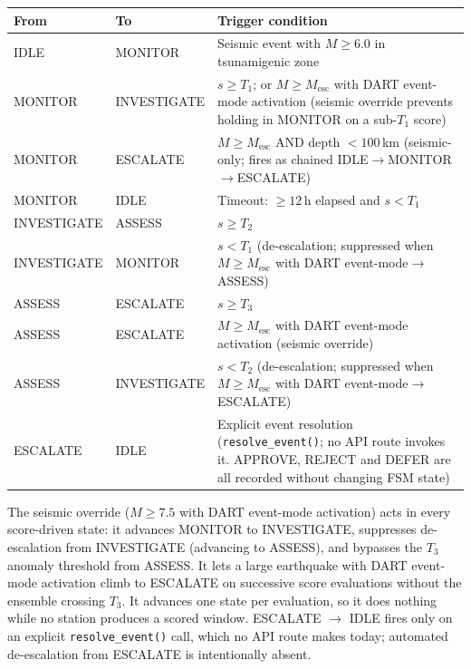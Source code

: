 \documentclass{article}
\begin{document}
\begin{center}
\begin{minipage}{\linewidth}
\centering
{}
\label{tab:fsm-rules}
\small
\begin{tabular}{@{}llp{5.5cm}@{}}
\toprule
From & To & Trigger condition \\
\midrule
IDLE & MONITOR & Seismic event with $M \geq 6.0$ in tsunamigenic zone \\
\addlinespace
MONITOR & INVESTIGATE & $s \geq T_1$; or $M \geq M_{\mathrm{esc}}$ with DART event-mode activation (seismic override prevents holding in MONITOR on a sub-$T_1$ score) \\
MONITOR & ESCALATE & $M \geq M_{\mathrm{esc}}$ AND depth $< 100$\,km (seismic-only; fires as chained IDLE$\to$MONITOR$\to$ESCALATE) \\
MONITOR & IDLE & Timeout: $\geq 12$\,h elapsed and $s < T_1$ \\
\addlinespace
INVESTIGATE & ASSESS & $s \geq T_2$ \\
INVESTIGATE & MONITOR & $s < T_1$ (de-escalation; suppressed when $M \geq M_{\mathrm{esc}}$ with DART event-mode$\to$ASSESS) \\
\addlinespace
ASSESS & ESCALATE & $s \geq T_3$ \\
ASSESS & ESCALATE & $M \geq M_{\mathrm{esc}}$ with DART event-mode activation (seismic override) \\
ASSESS & INVESTIGATE & $s < T_2$ (de-escalation; suppressed when $M \geq M_{\mathrm{esc}}$ with DART event-mode$\to$ESCALATE) \\
\addlinespace
ESCALATE & IDLE & Explicit event resolution (\texttt{resolve\_event()}; no API route invokes it. APPROVE, REJECT and DEFER are all recorded without changing FSM state) \\
\bottomrule
\end{tabular}
\end{minipage}
\end{center}

The seismic override ($M \geq 7.5$ with DART event-mode activation)
acts in every score-driven state: it advances MONITOR to INVESTIGATE,
suppresses de-escalation from INVESTIGATE (advancing to ASSESS), and
bypasses the $T_3$ anomaly threshold from ASSESS.  It lets a large
earthquake with DART event-mode activation climb to ESCALATE on
successive score evaluations without the ensemble crossing $T_3$.  It
advances one state per evaluation, so it does nothing while no station
produces a scored window.  ESCALATE $\to$ IDLE fires only on an
explicit \texttt{resolve\_event()} call, which no API route makes
today; automated de-escalation from ESCALATE is intentionally absent.
\end{document}
